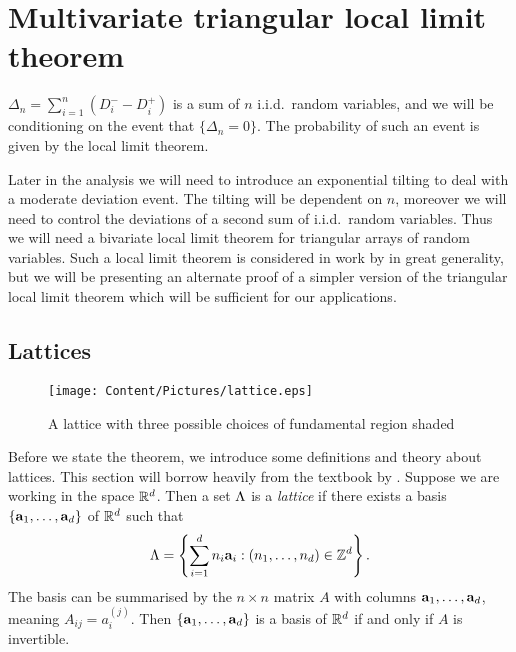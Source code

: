 \section{Multivariate triangular local limit theorem}
\label{sec:llt}

$\Delta_n = \sum_{i=1}^n (D_i^- - D_i^+)$ is a sum of $n$ i.i.d.\ random variables, and we will be conditioning on the event that $\{\Delta_n = 0\}$. The probability of such an event is given by the local limit theorem.

Later in the analysis we will need to introduce an exponential tilting to deal with a moderate deviation event. The tilting will be dependent on $n$, moreover we will need to control the deviations of a second sum of i.i.d.\ random variables. Thus we will need a bivariate local limit theorem for triangular arrays of random variables. Such a local limit theorem is considered in work by \citet{mukhinLocalLimitTheorems1992} in great generality, but we will be presenting an alternate proof of a simpler version of the triangular local limit theorem which will be sufficient for our applications.

\subsection{Lattices}

\begin{figure}[htbp]
    \centering
    \texttt{[image: Content/Pictures/lattice.eps]}
    \caption{A lattice with three possible choices of fundamental region shaded}
    \label{fig:lattice}
\end{figure}

Before we state the theorem, we introduce some definitions and theory about lattices. This section will borrow heavily from the textbook by \citet{schrijverTheoryLinearInteger1998}. Suppose we are working in the space ${\mathbb R}^d$. Then a set $\Lambda$ is a \emph{lattice} if there exists a basis $\{{\mathbf a}_1, \ldots, {\mathbf a}_d\}$ of ${\mathbb R}^d$ such that
\begin{equation*}
    \Lambda = \left\{ \sum_{i=1}^d n_i {\mathbf a}_i : (n_1, \ldots, n_d) \in {\mathbb Z}^d \right\}.
\end{equation*}
The basis can be summarised by the $n \times n$ matrix $A$ with columns ${\mathbf a}_1, \ldots, {\mathbf a}_d$, meaning $A_{ij} = a_i^{(j)}$. Then $\{{\mathbf a}_1, \ldots, {\mathbf a}_d\}$ is a basis of ${\mathbb R}^d$ if and only if $A$ is invertible. 

